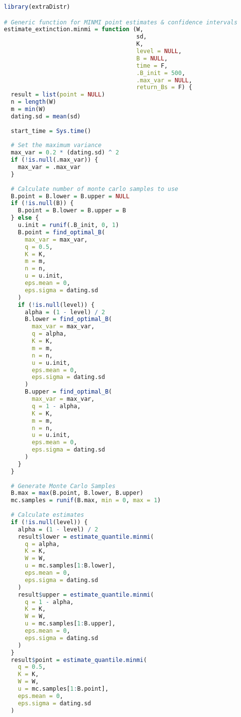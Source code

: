 \begin{lstlisting}[language=R, caption = {Functions implementing MINMI in R.}]
library(extraDistr)

# Generic function for MINMI point estimates & confidence intervals
estimate_extinction.minmi = function (W,
                                      sd,
                                      K,
                                      level = NULL,
                                      B = NULL,
                                      time = F,
                                      .B_init = 500,
                                      .max_var = NULL,
                                      return_Bs = F) {
  result = list(point = NULL)
  n = length(W)
  m = min(W)
  dating.sd = mean(sd)
  
  start_time = Sys.time()
  
  # Set the maximum variance
  max_var = 0.2 * (dating.sd) ^ 2
  if (!is.null(.max_var)) {
    max_var = .max_var
  }
  
  # Calculate number of monte carlo samples to use
  B.point = B.lower = B.upper = NULL
  if (!is.null(B)) {
    B.point = B.lower = B.upper = B
  } else {
    u.init = runif(.B_init, 0, 1)
    B.point = find_optimal_B(
      max_var = max_var,
      q = 0.5,
      K = K,
      m = m,
      n = n,
      u = u.init,
      eps.mean = 0,
      eps.sigma = dating.sd
    )
    if (!is.null(level)) {
      alpha = (1 - level) / 2
      B.lower = find_optimal_B(
        max_var = max_var,
        q = alpha,
        K = K,
        m = m,
        n = n,
        u = u.init,
        eps.mean = 0,
        eps.sigma = dating.sd
      )
      B.upper = find_optimal_B(
        max_var = max_var,
        q = 1 - alpha,
        K = K,
        m = m,
        n = n,
        u = u.init,
        eps.mean = 0,
        eps.sigma = dating.sd
      )
    }
  }
  
  # Generate Monte Carlo Samples
  B.max = max(B.point, B.lower, B.upper)
  mc.samples = runif(B.max, min = 0, max = 1)
  
  # Calculate estimates
  if (!is.null(level)) {
    alpha = (1 - level) / 2
    result$lower = estimate_quantile.minmi(
      q = alpha,
      K = K,
      W = W,
      u = mc.samples[1:B.lower],
      eps.mean = 0,
      eps.sigma = dating.sd
    )
    result$upper = estimate_quantile.minmi(
      q = 1 - alpha,
      K = K,
      W = W,
      u = mc.samples[1:B.upper],
      eps.mean = 0,
      eps.sigma = dating.sd
    )
  }
  result$point = estimate_quantile.minmi(
    q = 0.5,
    K = K,
    W = W,
    u = mc.samples[1:B.point],
    eps.mean = 0,
    eps.sigma = dating.sd
  )
  

\end{lstlisting}
